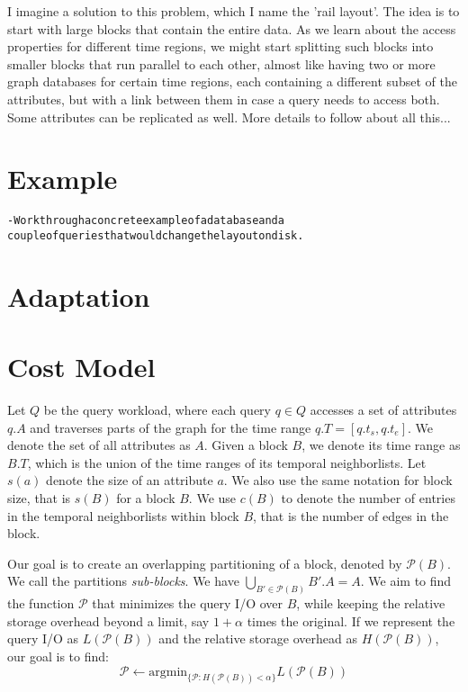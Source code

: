 \documentclass{sig-alternate}
\begin{document}
I imagine a solution to this problem, which I name the 'rail layout'. The idea
is to start with large blocks that contain the entire data. As we learn about
the access properties for different time regions, we might start splitting
such blocks into smaller blocks that run parallel to each other, almost like
having two or more graph databases for certain time regions, each containing a
 different subset of the attributes, but with a link between them in case a
query needs to access both. Some attributes can be replicated as well. 
More details to follow about all this...

\section{Example}

\begin{alltt}\scriptsize
- Work through a concrete example of a database and a 
   couple of queries that would change the layout on disk.
\end{alltt}




\section{Adaptation}

\section{Cost Model}

Let $Q$ be the query workload, where each query $q\in Q$ accesses a set of
attributes $q.A$ and traverses parts of the graph for the time range
$q.T=[q.t_s,q.t_e]$. We denote the set of all attributes as $A$. Given a block
$B$, we denote its time range as $B.T$, which is the union of the time ranges
of its temporal neighborlists. Let $s(a)$ denote the size of an attribute $a$.
We also use the same notation for block size, that is $s(B)$ for a block $B$. 
We use $c(B)$ to denote the number of entries in the temporal neighborlists
within block $B$, that is the number of edges in the block. 

Our goal is to create an overlapping partitioning of a block, denoted by
$\mathcal{P}(B)$. We call the partitions \emph{sub-blocks}. We have
$\bigcup_{B'\in \mathcal{P}(B)} B'.A = A$. We aim to find the function
$\mathcal{P}$ that minimizes the query I/O over $B$, while keeping the
relative storage overhead beyond a limit, say $1+\alpha$ times the original.
If we represent the query I/O as $L(\mathcal{P}(B))$ and the relative storage
overhead as $H(\mathcal{P}(B))$, our goal is to find:
\begin{equation}
\mathcal{P} \leftarrow \mbox{argmin}_{\{\mathcal{P}: H(\mathcal{P}(B)) < \alpha\}} L(\mathcal{P}(B))
\end{equation}
\end{document}
